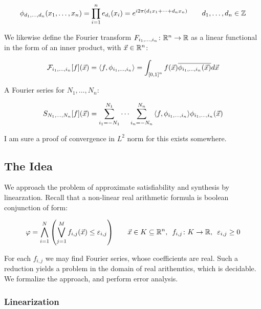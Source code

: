 \documentclass[12pt]{article}
\begin{document}
\begin{align*}
  \phi_{d_1, \ldots, d_n} {\left(x_1, \ldots, x_n\right)}
    = \prod_{i = 1}^{n} e_{d_i} {\left(x_i\right)}
    = e^{i 2 \pi {\left(d_1 x_1 + \cdots + d_n x_n\right)}}
    \qquad
    d_1, \ldots, d_n \in {\mathbb{Z}}
\end{align*}

We likewise define the
Fourier transform ${F_{i_1, \ldots, i_n} \colon {\mathbb{R}}^n \to {\mathbb{R}}}$ as a
linear functional in the form of an inner product,
with $\vec{x} \in {\mathbb{R}}^n$:

\begin{align*}
  \mathcal{F}_{i_1, \ldots, i_n} {\left[f\right]} {\left(\vec{x}\right)}
    = {\left\langle f, \phi_{i_1, \ldots, i_n}\right\rangle}
    = \int_{{\left[0, 1\right]}^n}
      f{\left(\vec{x}\right)} \overline{\phi_{i_1, \ldots, i_n} {\left(\vec{x}\right)}} d \vec{x}
\end{align*}

A Fourier series for $N_1, \ldots, N_n$:

\begin{align*}
  S_{N_1, \ldots, N_n} {\left[f\right]} {\left(\vec{x}\right)}
    = \sum_{i_1 = -N_1}^{N_1} \cdots \sum_{i_n = -N_n}^{N_n}
        {\left\langle f, \phi_{i_1, \ldots, i_n}\right\rangle} \phi_{i_1, \ldots, i_n}
          {\left(\vec{x}\right)}
\end{align*}

I am sure a proof of convergence in $L^2$ norm for this exists somewhere.


\subsection{The Idea}
We approach the problem of approximate satisfiability and synthesis
by linearzation.
Recall that a non-linear real arithmetic formula is boolean conjunction
of form:

\begin{align*}
  \varphi
    = \bigwedge_{i = 1}^{N} {\left(\bigvee_{j = 1}^{M}
        f_{i, j}{\left(\vec{x}\right)} \leq \varepsilon_{i, j}\right)}
  \qquad
  \vec{x} \in K \subseteq {\mathbb{R}}^n, \enskip
  {f_{i, j} \colon K \to {\mathbb{R}}}, \enskip
  \varepsilon_{i, j} \geq 0
\end{align*}

For each $f_{i, j}$ we may find Fourier series, whose coefficients are real.
Such a reduction yields a problem in the domain of real arithemtics, which
is decidable.
We formalize the approach, and perform error analysis.

\subsubsection{Linearization}
\end{document}
